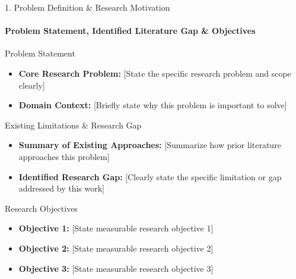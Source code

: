 \documentclass[aspectratio=169, 11pt]{beamer}
\begin{document}
\begin{frame}{1. Problem Definition \& Research Motivation}
    \framesubtitle{Problem Statement, Identified Literature Gap \& Objectives}
    \begin{block}{Problem Statement}
        \begin{itemize}
            \item \textbf{Core Research Problem:} {[State the specific research problem and scope clearly]}
            \item \textbf{Domain Context:} {[Briefly state why this problem is important to solve]}
        \end{itemize}
    \end{block}

    \begin{block}{Existing Limitations \& Research Gap}
        \begin{itemize}
            \item \textbf{Summary of Existing Approaches:} {[Summarize how prior literature approaches this problem]}
            \item \textbf{Identified Research Gap:} {[Clearly state the specific limitation or gap addressed by this work]}
        \end{itemize}
    \end{block}

    \begin{block}{Research Objectives}
        \begin{itemize}
            \item \textbf{Objective 1:} {[State measurable research objective 1]}
            \item \textbf{Objective 2:} {[State measurable research objective 2]}
            \item \textbf{Objective 3:} {[State measurable research objective 3]}
        \end{itemize}
    \end{block}
\end{frame}
\end{document}
